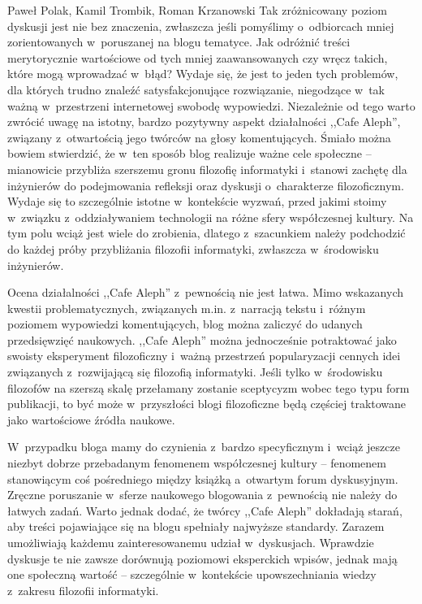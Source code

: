 \begin{newrevplenv}{Paweł Polak, Kamil Trombik, Roman Krzanowski}
Tak zróżnicowany poziom dyskusji jest nie bez znaczenia, zwłaszcza jeśli pomyślimy o~odbiorcach mniej zorientowanych w~poruszanej na blogu tematyce. Jak odróżnić treści merytorycznie wartościowe od tych mniej zaawansowanych czy wręcz takich, które mogą wprowadzać w~błąd? Wydaje się, że jest to jeden tych problemów, dla których trudno znaleźć satysfakcjonujące rozwiązanie, niegodzące w~tak ważną w~przestrzeni internetowej swobodę wypowiedzi. Niezależnie od tego warto zwrócić uwagę na istotny, bardzo pozytywny aspekt działalności ,,Cafe Aleph'', związany z~otwartością jego twórców na głosy komentujących. Śmiało można bowiem stwierdzić, że w~ten sposób blog realizuje ważne cele społeczne -- mianowicie przybliża szerszemu gronu filozofię informatyki i~stanowi zachętę dla inżynierów do podejmowania refleksji oraz dyskusji o~charakterze filozoficznym. Wydaje się to szczególnie istotne w~kontekście wyzwań, przed jakimi stoimy w~związku z~oddziaływaniem technologii na różne sfery współczesnej kultury. Na tym polu wciąż jest wiele do zrobienia, dlatego z~szacunkiem należy podchodzić do każdej próby przybliżania filozofii informatyki, zwłaszcza w~środowisku inżynierów.

Ocena działalności ,,Cafe Aleph'' z~pewnością nie jest łatwa. Mimo wskazanych kwestii problematycznych, związanych m.in. z~narracją tekstu i~różnym poziomem wypowiedzi komentujących, blog można zaliczyć do udanych przedsięwzięć naukowych. ,,Cafe Aleph'' można jednocześnie potraktować jako swoisty eksperyment filozoficzny i~ważną przestrzeń popularyzacji cennych idei związanych z~rozwijającą się filozofią informatyki. Jeśli tylko w~środowisku filozofów na szerszą skalę przełamany zostanie sceptycyzm wobec tego typu form publikacji, to być może w~przyszłości blogi filozoficzne będą częściej traktowane jako wartościowe źródła naukowe.

W~przypadku bloga mamy do czynienia z~bardzo specyficznym i~wciąż jeszcze niezbyt dobrze przebadanym fenomenem współczesnej kultury -- fenomenem stanowiącym coś pośredniego między książką a~otwartym forum dyskusyjnym. Zręczne poruszanie w~sferze naukowego blogowania z~pewnością nie należy do łatwych zadań. Warto jednak dodać, że twórcy ,,Cafe Aleph'' dokładają starań, aby treści pojawiające się na blogu spełniały najwyższe standardy. Zarazem umożliwiają każdemu zainteresowanemu udział w~dyskusjach. Wprawdzie dyskusje te nie zawsze dorównują poziomowi eksperckich wpisów, jednak mają one społeczną wartość -- szczególnie w~kontekście upowszechniania wiedzy z~zakresu filozofii informatyki.


\end{newrevplenv}

